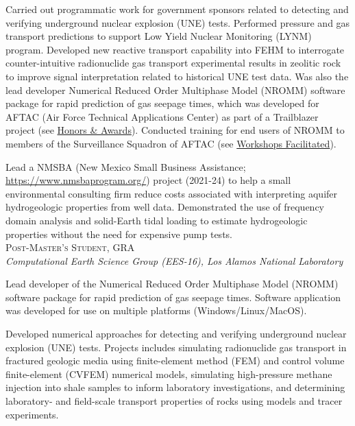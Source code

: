 \documentclass[11pt, letterpaper]{article}
\newcommand{\years}[1]{\marginnote{\scriptsize #1}}
\begin{document}
    Carried out programmatic work for government sponsors related to detecting
    and verifying underground nuclear explosion (UNE) tests. Performed pressure
    and gas transport predictions to support Low Yield Nuclear Monitoring
    (LYNM) program. Developed new reactive transport capability into FEHM to
    interrogate counter-intuitive radionuclide gas transport experimental
    results in zeolitic rock to improve signal interpretation related to
    historical UNE test data. Was also the lead developer Numerical Reduced
    Order Multiphase Model (NROMM) software package for rapid prediction of gas
    seepage times, which was developed for AFTAC (Air Force Technical
    Applications Center) as part of a Trailblazer project (see
        \hyperref[sec:awards]{Honors \& Awards}). Conducted training for end users of 
        NROMM to members of the  Surveillance Squadron of AFTAC  (see
        \hyperref[sec:workshopsFacilitated]{Workshops Facilitated}). 

	Lead a NMSBA (New Mexico Small Business Assistance;
	\href{https://www.nmsbaprogram.org/}{https://www.nmsbaprogram.org/})
	project (2021-24) to help a small environmental consulting firm reduce
	costs associated with interpreting aquifer hydrogeologic properties from
	well data.  Demonstrated the use of frequency domain analysis and
	solid-Earth tidal loading to estimate hydrogeologic properties without the
	need for expensive pump tests. \\

\noindent
\years{2017 - 2019}\textsc{Post-Master's Student, GRA}\\
\textit{Computational Earth Science Group (EES-16), Los Alamos National Laboratory}

    \vspace{3pt} \noindent  
	Lead developer of the Numerical Reduced Order Multiphase Model (NROMM)
	software package for rapid prediction of gas seepage times. Software
	application was developed for use on multiple platforms
	(Windows/Linux/MacOS).

	Developed numerical approaches for detecting and verifying underground
	nuclear explosion (UNE) tests. Projects includes simulating
	radionuclide gas transport in fractured geologic media using finite-element
	method (FEM) and control volume finite-element (CVFEM) numerical models,
	simulating high-pressure methane injection into shale samples to inform
	laboratory investigations, and determining laboratory- and field-scale
	transport properties of rocks using models and tracer experiments.
\end{document}
